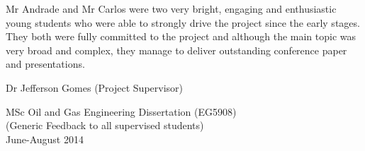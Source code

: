 \documentclass[14pt,twoside]{report}
\begin{document}
Mr Andrade and Mr Carlos were two very bright, engaging and enthusiastic young students who were able to strongly drive the project since the early stages. They both were fully committed to the project and although the main topic was very broad and complex, they manage to deliver outstanding conference paper and presentations.
 
\begin{center}
\vspace{-.5cm}
{Dr Jefferson Gomes (Project Supervisor)}\\
\end{center}



\clearpage



\begin{center}
\Huge{MSc Oil and Gas Engineering Dissertation (EG5908)}\\
\huge{(Generic Feedback to all supervised students)}\\
\huge{June-August 2014}
\end{center}

\vfill

\clearpage

\end{document}
